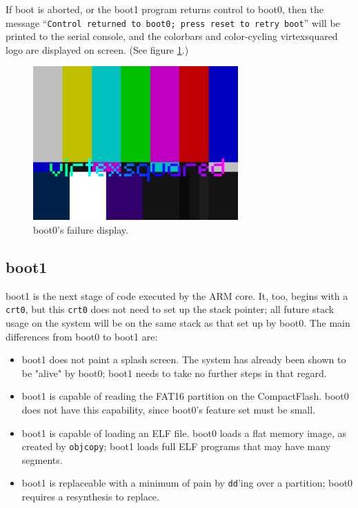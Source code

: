 \documentclass[10pt]{report}
\begin{document}
If boot is aborted, or the boot1 program returns control to boot0, then the
message ``\texttt{Control returned to boot0; press reset to retry boot}'' will
be printed to the serial console, and the colorbars and color-cycling
virtexsquared logo are displayed on screen.  (See figure \ref{img:boot0}.)

\begin{figure}
  \centering
    \includegraphics[width=0.7\textwidth]{boot0.png}
  \caption{boot0's failure display.} \label{img:boot0}
\end{figure}

\subsection{boot1}

boot1 is the next stage of code executed by the ARM core. It, too, begins
with a \texttt{crt0}, but this \texttt{crt0} does not need to set up the
stack pointer; all future stack usage on the system will be on the same
stack as that set up by boot0.  The main differences from boot0 to boot1
are:

\begin{itemize}
\item{boot1 does not paint a splash screen. The system has already been
shown to be "alive" by boot0; boot1 needs to take no further steps in that
regard.}
\item{boot1 is capable of reading the FAT16 partition on the CompactFlash.
boot0 does not have this capability, since boot0's feature set must be
small.}
\item{boot1 is capable of loading an ELF file. boot0 loads a flat memory
image, as created by \texttt{objcopy}; boot1 loads full ELF programs that
may have many segments.}
\item{boot1 is replaceable with a minimum of pain by \texttt{dd}'ing over a
partition; boot0 requires a resynthesis to replace.}
\end{itemize}
\end{document}
